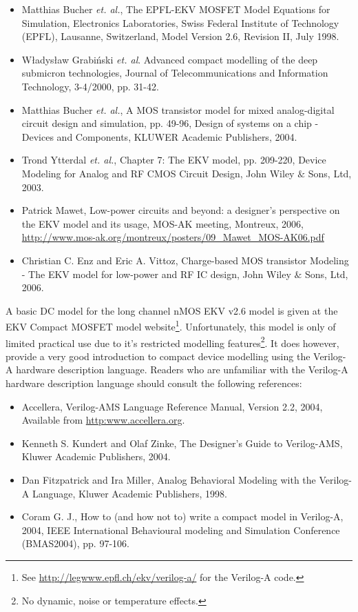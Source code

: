 \begin{itemize}
 \item Matthias Bucher \textit{et. al.}, The EPFL-EKV MOSFET Model Equations for Simulation, Electronics Laboratories, Swiss Federal Institute of Technology (EPFL), Lausanne, Switzerland, Model Version 2.6, Revision II, July 1998.
 \item W\l adys\l aw Grabi\'{n}ski \textit{et. al}. Advanced compact modelling of the deep submicron technologies, Journal of Telecommunications and Information Technology, 3-4/2000, pp. 31-42. 
 \item Matthias Bucher \textit{et. al.}, A MOS transistor model for mixed analog-digital circuit design and simulation, pp. 49-96, Design of systems on a chip - Devices and Components, KLUWER Academic Publishers, 2004.
\item Trond Ytterdal \textit{et. al.}, Chapter 7: The EKV model, pp. 209-220, Device Modeling for Analog and RF CMOS Circuit Design, John Wiley $\&$ Sons, Ltd, 2003.
\item Patrick Mawet, Low-power circuits and beyond: a designer's perspective on the EKV model and its usage, MOS-AK meeting, Montreux, 2006, \url{http://www.mos-ak.org/montreux/posters/09_Mawet_MOS-AK06.pdf}
\item Christian C. Enz and Eric A. Vittoz, Charge-based MOS transistor Modeling - The EKV model for low-power and RF IC design, John Wiley $\&$ Sons, Ltd, 2006.
\end{itemize}
 




A basic DC model for the long channel nMOS EKV v2.6 model is given at
the EKV Compact MOSFET model website\footnote{See
\url{http://legwww.epfl.ch/ekv/verilog-a/} for the Verilog-A
code.}. Unfortunately, this model is only of limited practical use due
to it's restricted modelling features\footnote{No dynamic, noise or
temperature effects.}.  It does however, provide a very good
introduction to compact device modelling using the Verilog-A hardware
description language. Readers who are unfamiliar with the Verilog-A
hardware description language should consult the following references:

\begin{itemize}
 \item Accellera, Verilog-AMS Language Reference Manual, Version 2.2, 2004, Available from \url{http:www.accellera.org}.
 \item Kenneth S. Kundert and Olaf Zinke, The Designer's Guide to Verilog-AMS, Kluwer Academic Publishers, 2004.
 \item Dan Fitzpatrick and Ira Miller, Analog Behavioral Modeling with the Verilog-A Language, Kluwer Academic Publishers, 1998.
\item Coram G. J., How to (and how not to) write a compact model in Verilog-A, 2004, IEEE International Behavioural modeling and Simulation Conference (BMAS2004), pp. 97-106.
\end{itemize}

